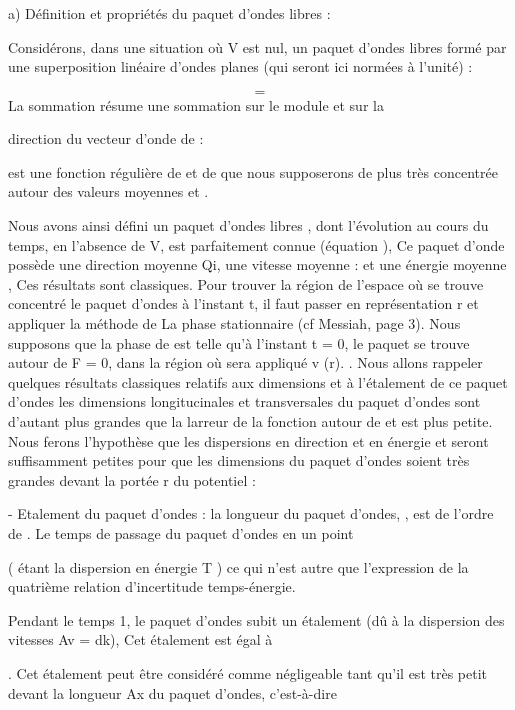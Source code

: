 \subsubsection{}%
a) Définition et propriétés du paquet d'ondes libres :

Considérons, dans une situation où V est nul, un paquet d'ondes
libres formé par une superposition linéaire d'ondes planes 
(qui seront ici normées à l'unité) :

\[
\tag{40}=
\]
La sommation résume une sommation sur le module  et sur la

direction  du vecteur d'onde de :

 est une fonction régulière de  et de  que nous supposerons
de plus très concentrée autour des valeurs moyennes  et .


Nous avons ainsi défini un paquet d'ondes libres ,
dont l'évolution au cours du temps, en l'absence de V, est parfaitement
connue (équation ),
Ce paquet d'onde possède une direction moyenne Qi, une vitesse moyenne :  et une
énergie moyenne , Ces résultats sont classiques. Pour trouver la région de l'espace
où se trouve concentré le paquet d'ondes à l'instant t, il faut passer en
représentation r et appliquer
la méthode de La phase stationnaire (cf Messiah, page 3).
Nous supposons que la phase de est telle qu'à
l'instant t = 0, le paquet se trouve autour de F = 0, dans la
région où sera appliqué v (r).
. Nous allons rappeler quelques résultats classiques relatifs
aux dimensions et à l'étalement de ce paquet d'ondes 
 les dimensions longitucinales et transversales du paquet d'ondes sont
d'autant plus grandes que la larreur de la fonction  autour de
 et  est plus petite. Nous ferons l'hypothèse que les dispersions en
direction et en énergie  et  seront suffisamment petites pour que les
dimensions du paquet d'ondes soient très grandes devant la portée r du
potentiel :

- Etalement du paquet d'ondes : la longueur du paquet d'ondes, , est
de l'ordre de . Le temps de passage du paquet d'ondes en un point

 ( étant la dispersion en énergie T )
ce qui n'est autre que l'expression de la quatrième relation d'incertitude
temps-énergie.

Pendant le temps 1, le paquet d'ondes subit un étalement (dû à
la dispersion des vitesses Av = dk), Cet étalement est égal à

. Cet étalement peut être considéré comme négligeable tant
qu'il est très petit devant la longueur Ax du paquet d'ondes, c'est-à-dire

